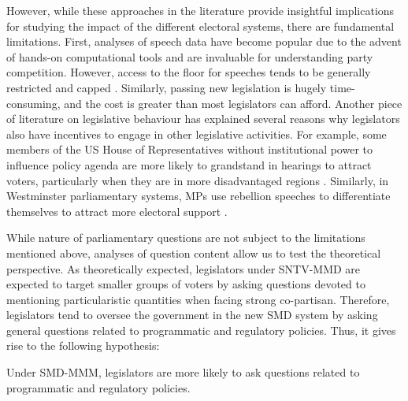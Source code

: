 However, while these approaches in the literature provide insightful implications for studying the impact of the different electoral systems, there are fundamental limitations. First, analyses of speech data have become popular due to the advent of hands-on computational tools and are invaluable for understanding party competition. However, access to the floor for speeches tends to be generally restricted and capped \citep{Proksch2009, Martin2011}. Similarly, passing new legislation is hugely time-consuming, and the cost is greater than most legislators can afford. Another piece of literature on legislative behaviour has explained several reasons why legislators also have incentives to engage in other legislative activities. For example, some members of the US House of Representatives without institutional power to influence policy agenda are more likely to grandstand in hearings to attract voters, particularly when they are in more disadvantaged regions \citep{Park2021}. Similarly, in Westminster parliamentary systems, MPs use rebellion speeches to differentiate themselves to attract more electoral support \citep{Slapin2018, Proksch2015}.

While nature of parliamentary questions are not subject to the limitations mentioned above, analyses of question content allow us to test the theoretical perspective. As theoretically expected, legislators under SNTV-MMD are expected to target smaller groups of voters by asking questions devoted to mentioning particularistic quantities when facing strong co-partisan. Therefore, legislators tend to oversee the government in the new SMD system by asking general questions related to programmatic and regulatory policies. Thus, it gives rise to the following hypothesis:

\begin{hyptwo}
Under SMD-MMM, legislators are more likely to ask questions related to programmatic and regulatory policies.\label{h:h2} 
\end{hyptwo}


